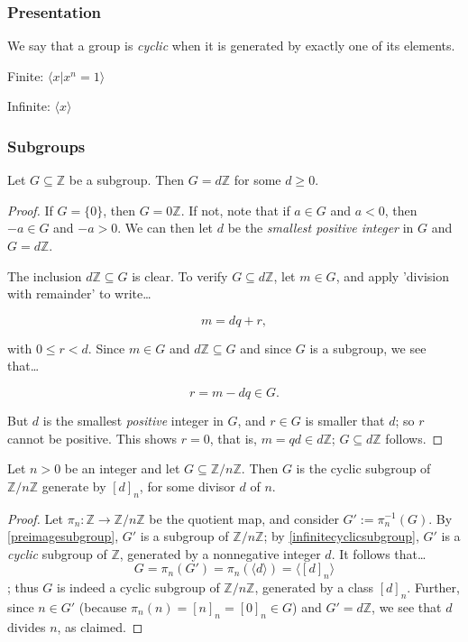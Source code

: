 \subsubsection{Presentation}
We say that a group is \emph{cyclic} when it is generated by exactly one of its elements.

\noindent Finite: $\langle x | x^n = 1 \rangle$\newline

\noindent Infinite: $\langle x \rangle$

\subsubsection{Subgroups}

\begin{proposition}
Let $G \subseteq \mathbb{Z}$ be a subgroup. Then $G = d\mathbb{Z}$ for some $d \geq 0$.
\end{proposition}

\begin{proof}
If $G = \{ 0 \}$, then $G = 0\mathbb{Z}$. If not, note that if $a \in G$ and $a < 0$, then $-a \in G$ and $-a > 0$.
We can then let $d$ be the \emph{smallest positive integer} in $G$ and $G = d\mathbb{Z}$.

The inclusion $d\mathbb{Z} \subseteq G$ is clear. To verify $G \subseteq d\mathbb{Z}$, let $m \in G$, and apply 'division with remainder'
to write\dots

$$m = dq + r,$$

with $0 \leq r < d$. Since $m \in G$ and $d\mathbb{Z} \subseteq G$ and since $G$ is a subgroup, we see that\dots

$$r = m - dq \in G.$$

But $d$ is the smallest \emph{positive} integer in $G$, and $r \in G$ is smaller that $d$; so $r$ cannot be positive. This shows $r = 0$, that is,
$m = qd \in d\mathbb{Z}$; $G \subseteq d\mathbb{Z}$ follows.
\end{proof}

\begin{proposition}
\label{infinitecyclicsubgroup}
Let $n > 0$ be an integer and let $G \subseteq \mathbb{Z}/n\mathbb{Z}$. Then $G$ is the cyclic subgroup of $\mathbb{Z}/n\mathbb{Z}$ generate by $[d]_n$,
for some divisor $d$ of $n$.
\end{proposition}

\begin{proof}
Let $\pi_n : \mathbb{Z} \rightarrow \mathbb{Z}/n\mathbb{Z}$ be the quotient map, and consider $G' := \pi_n^{-1}(G).$
By \ref{preimagesubgroup}, $G'$ is a subgroup of $\mathbb{Z}/n\mathbb{Z}$; by \ref{infinitecyclicsubgroup}, $G'$ is a
\emph{cyclic} subgroup of $\mathbb{Z}$, generated by a nonnegative integer $d$. It follows that\dots
$$G = \pi_n(G') = \pi_n(\langle d \rangle) = \langle [d]_n \rangle$$;
thus $G$ is indeed a cyclic subgroup of $\mathbb{Z}/n\mathbb{Z}$, generated by a class $[d]_n$. Further, since
$n \in G'$ (because $\pi_n(n) = [n]_n = [0]_n \in G$) and $G' = d\mathbb{Z}$, we see that $d$ divides $n$, as
claimed.
\end{proof}
